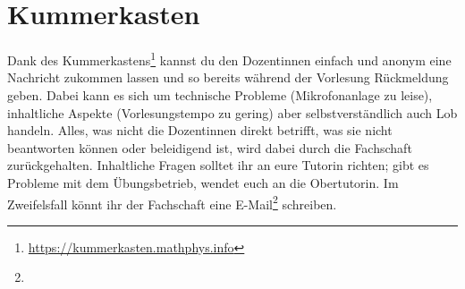 \section{Kummerkasten}
\label{kummerkasten}

Dank des Kummerkastens\footnote{\url{https://kummerkasten.mathphys.info}} kannst du den Dozentinnen einfach und anonym eine Nachricht zukommen lassen und so bereits während der Vorlesung Rückmeldung geben. Dabei kann es sich um technische Probleme (Mikrofonanlage zu leise), inhaltliche Aspekte (Vorlesungstempo zu gering) aber selbstverständlich auch Lob handeln. Alles, was nicht die Dozentinnen direkt betrifft, was sie nicht beantworten können oder beleidigend ist, wird dabei durch die Fachschaft zurückgehalten. Inhaltliche Fragen solltet ihr an eure Tutorin richten; gibt es Probleme mit dem Übungsbetrieb, wendet euch an die Obertutorin. Im Zweifelsfall könnt ihr der Fachschaft eine E-Mail\footnote{} schreiben.